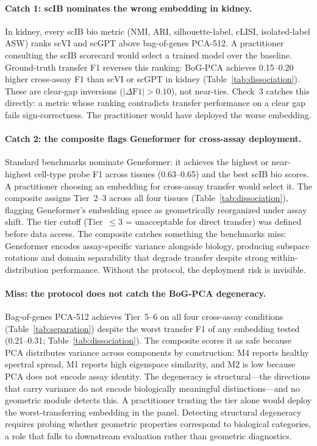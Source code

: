 \documentclass[10pt,letterpaper]{article}
\begin{document}
\paragraph{Catch 1: scIB nominates the wrong embedding in kidney.} In kidney, every scIB bio metric (NMI, ARI, silhouette-label, cLISI, isolated-label ASW) ranks scVI and scGPT above bag-of-genes PCA-512. A practitioner consulting the scIB scorecard would select a trained model over the baseline. Ground-truth transfer F1 reverses this ranking: BoG-PCA achieves 0.15--0.20 higher cross-assay F1 than scVI or scGPT in kidney (Table~\ref{tab:dissociation}). These are clear-gap inversions ($|\Delta\text{F1}| > 0.10$), not near-ties. Check~3 catches this directly: a metric whose ranking contradicts transfer performance on a clear gap fails sign-correctness. The practitioner would have deployed the worse embedding.

\paragraph{Catch 2: the composite flags Geneformer for cross-assay deployment.} Standard benchmarks nominate Geneformer: it achieves the highest or near-highest cell-type probe F1 across tissues (0.63--0.65) and the best scIB bio scores. A practitioner choosing an embedding for cross-assay transfer would select it. The composite assigns Tier~2--3 across all four tissues (Table~\ref{tab:dissociation}), flagging Geneformer's embedding space as geometrically reorganized under assay shift. The tier cutoff (Tier~$\leq 3$ = unacceptable for direct transfer) was defined before data access. The composite catches something the benchmarks miss: Geneformer encodes assay-specific variance alongside biology, producing subspace rotations and domain separability that degrade transfer despite strong within-distribution performance. Without the protocol, the deployment risk is invisible.

\paragraph{Miss: the protocol does not catch the BoG-PCA degeneracy.} Bag-of-genes PCA-512 achieves Tier~5--6 on all four cross-assay conditions (Table~\ref{tab:separation}) despite the worst transfer F1 of any embedding tested (0.21--0.31; Table~\ref{tab:dissociation}). The composite scores it as safe because PCA distributes variance across components by construction: M4 reports healthy spectral spread, M1 reports high eigenspace similarity, and M2 is low because PCA does not encode assay identity. The degeneracy is structural---the directions that carry variance do not encode biologically meaningful distinctions---and no geometric module detects this. A practitioner trusting the tier alone would deploy the worst-transferring embedding in the panel. Detecting structural degeneracy requires probing whether geometric properties correspond to biological categories, a role that falls to downstream evaluation rather than geometric diagnostics.
\end{document}
